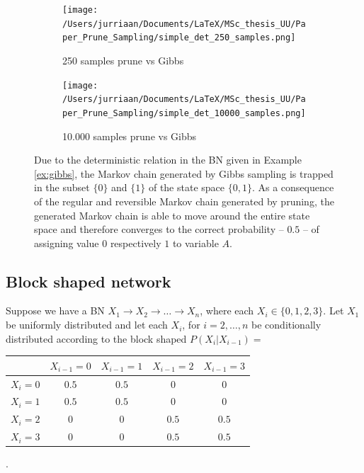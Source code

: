 \documentclass[a4paper, twoside, 11pt]{report}
\theoremstyle{plain}
\theoremstyle{definition}
\theoremstyle{remark}
\begin{document}
\begin{figure}[h!]
\centering
\begin{subfigure}{.49\textwidth}
  \centering
  \texttt{[image: /Users/jurriaan/Documents/LaTeX/MSc\_thesis\_UU/Paper\_Prune\_Sampling/simple\_det\_250\_samples.png]}
  \caption{250 samples prune vs Gibbs}
  \label{fig:sub1}
\end{subfigure}
\begin{subfigure}{.49\textwidth}
  \centering
  \texttt{[image: /Users/jurriaan/Documents/LaTeX/MSc\_thesis\_UU/Paper\_Prune\_Sampling/simple\_det\_10000\_samples.png]}
  \caption{10.000 samples prune vs Gibbs}
  \label{fig:sub2}
\end{subfigure}
\caption{Due to the deterministic relation in the BN given in Example \ref{ex:gibbs}, the Markov chain generated by Gibbs sampling is trapped in the subset $\{0\}$ and $\{1\}$ of the state space $\{0,1\}$. As a consequence of the regular and reversible Markov chain generated by pruning, the generated Markov chain is able to move around the entire state space and therefore converges to the correct probability -- $0.5$ -- of assigning value $0$ respectively $1$ to variable $A$.}
\label{simple-deterministic}
\end{figure}

\subsection{Block shaped network}
Suppose we have a BN $X_1 \to X_2 \to \ldots \to X_n$, where each $X_i \in \{0,1,2,3\}$. Let $X_1$ be uniformly distributed and let each $X_i$, for $i = 2, \ldots , n$ be conditionally distributed according to the block shaped $P(X_i |X_{i-1})=$
\begin{table}[h]
\centering
\begin{tabular}{|c||c|c|c|c|} \hline
	&$X_{i-1}=0$ & $ X_{i-1}=1 $ & $X_{i-1}=2$ & $X_{i-1}=3$  \\ \hline \hline
	$X_i =0$ & $0.5$ & $0.5$ & $0$ & $0$ \\ \hline
	$X_i =1$ & $0.5$ & $0.5$ & $0$ & $0$ \\ \hline
	$X_i =2$ & $0$ & $0$ & $0.5$ & $0.5$ \\ \hline
	$X_i =3$ & $0$ & $0$ & $0.5$ & $0.5$ \\ \hline
\end{tabular}
.
\end{table}
\end{document}
